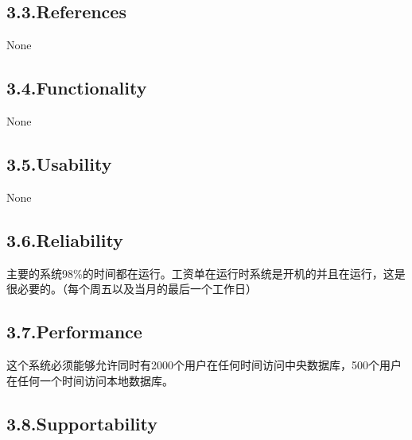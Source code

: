 \documentclass{article}
\begin{document}
\subsection{3.3.\hspace*{0.5em}References}\label{sec-references}%

\noindent{}None%

\subsection{3.4.\hspace*{0.5em}Functionality}\label{sec-functionality}%

\noindent{}None%

\subsection{3.5.\hspace*{0.5em}Usability}\label{sec-usability}%

\noindent{}None%

\subsection{3.6.\hspace*{0.5em}Reliability}\label{sec-reliability}%

\noindent{}主要的系统98\%的时间都在运行。工资单在运行时系统是开机的并且在运行，这是很必要的。（每个周五以及当月的最后一个工作日）%

\subsection{3.7.\hspace*{0.5em}Performance}\label{sec-performance}%

\noindent{}这个系统必须能够允许同时有2000个用户在任何时间访问中央数据库，500个用户在任何一个时间访问本地数据库。%

\subsection{3.8.\hspace*{0.5em}Supportability}\label{sec-supportability}%
\end{document}

